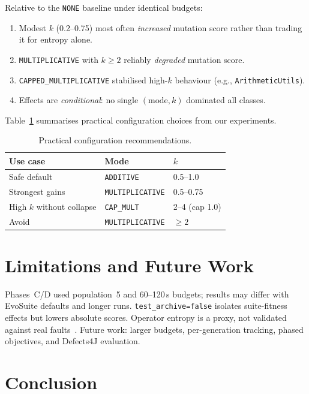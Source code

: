 \documentclass{IEEEtran}
\begin{document}
Relative to the \texttt{NONE} baseline under identical budgets:

\begin{enumerate}
\item Modest $k$ (0.2--0.75) most often \emph{increased} mutation score rather than trading it for entropy alone.
\item \texttt{MULTIPLICATIVE} with $k \geq 2$ reliably \emph{degraded} mutation score.
\item \texttt{CAPPED\_MULTIPLICATIVE} stabilised high-$k$ behaviour (e.g., \texttt{ArithmeticUtils}).
\item Effects are \emph{conditional}: no single $(\mathrm{mode}, k)$ dominated all classes.
\end{enumerate}

Table~\ref{tab:recommend} summarises practical configuration choices from our experiments.

\begin{table}[htbp]
\caption{Practical configuration recommendations.}
\label{tab:recommend}
\centering
\footnotesize
\begin{tabular}{@{}lll@{}}
\toprule
Use case & Mode & $k$ \\
\midrule
Safe default & \texttt{ADDITIVE} & 0.5--1.0 \\
Strongest gains & \texttt{MULTIPLICATIVE} & 0.5--0.75 \\
High $k$ without collapse & \texttt{CAP\_MULT} & 2--4 (cap 1.0) \\
Avoid & \texttt{MULTIPLICATIVE} & $\geq 2$ \\
\bottomrule
\end{tabular}
\end{table}

\section{Limitations and Future Work}

Phases~C/D used population~5 and 60--120\,s budgets; results may differ with EvoSuite defaults and longer runs.
\texttt{test\_archive=false} isolates suite-fitness effects but lowers absolute scores.
Operator entropy is a proxy, not validated against real faults~\cite{just2014mutants}.
Future work: larger budgets, per-generation tracking, phased objectives, and Defects4J evaluation.

\section{Conclusion}
\end{document}
